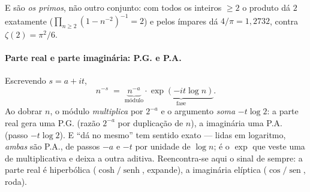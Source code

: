 \documentclass[11pt,a4paper]{article}
\theoremstyle{plain}
\theoremstyle{definition}
\theoremstyle{remark}
\providecommand{\sen}{\operatorname{sen}}
\providecommand{\senh}{\operatorname{senh}}
\begin{document}
E são \emph{os primos}, não outro conjunto: com todos os inteiros $\geq2$ o produto dá $2$
exatamente ($\prod_{n\geq2}(1-n^{-2})^{-1}=2$) e pelos ímpares dá $4/\pi = 1{,}2732$, contra
$\zeta(2) = \pi^2/6$.

\paragraph{Parte real e parte imaginária: P.G. e P.A.} Escrevendo $s = a+it$,
\[
  n^{-s} \;=\; \underbrace{n^{-a}}_{\text{módulo}} \cdot
               \underbrace{\exp(-it\log n)}_{\text{fase}} .
\]
Ao dobrar $n$, o módulo \emph{multiplica} por $2^{-a}$ e o argumento \emph{soma} $-t\log 2$: a parte
real gera uma P.G. (razão $2^{-a}$ por duplicação de $n$), a imaginária uma P.A. (passo
$-t\log2$). E ``dá no mesmo'' tem sentido exato --- lidas em logaritmo, \emph{ambas} são P.A., de
passos $-a$ e $-t$ por unidade de $\log n$; é o $\exp$ que veste uma de multiplicativa e deixa a
outra aditiva. Reencontra-se aqui o sinal de sempre: a parte real é hiperbólica
($\cosh/\senh$, expande), a imaginária elíptica ($\cos/\sen$, roda).
\end{document}
